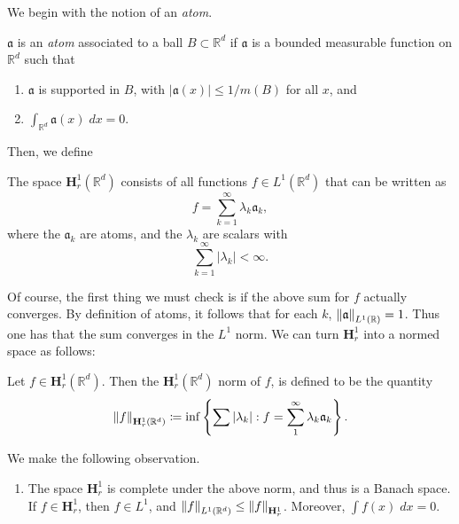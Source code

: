 \documentclass{article}
\begin{document}
 We begin with the notion of an \textit{atom}. 
\begin{definition}[Atom]
	$\mathfrak{a}$ is an \textit{atom} associated to a ball $B\subset \mathbb{R}^{d}$ if $\mathfrak{a}$ is a bounded measurable function on $\mathbb{R}^{d}$ such that \vspace{-0.25cm}
	\begin{enumerate}[itemsep =-2pt, label = (\roman{*})]
		\item $\mathfrak{a}$ is supported in $B$, with $|\mathfrak{a}(x)| \leq 1/m(B)$ for all $x$, and 
		\item $\int_{\mathbb{R}^{d}} \mathfrak{a}(x)\;dx = 0$. 
	\end{enumerate} 
\end{definition} 
Then, we define 
\begin{definition}
	The space $\mathbf{H}_{r}^{1}(\mathbb{R}^{d})$ consists of all functions $f \in L^{1}(\mathbb{R}^{d})$ that can be written as 
	\begin{equation*}
		f = \sum_{k = 1}^{\infty}\lambda_{k}\mathfrak{a}_{k}, 
	\end{equation*} 
	where the $\mathfrak{a}_{k}$ are atoms, and the $\lambda_{k}$ are scalars with 
	\begin{equation*}
		\sum_{k = 1}^{\infty}|\lambda_{k}| < \infty. 
	\end{equation*}
\end{definition} 
Of course, the first thing we must check is if the above sum for $f$ actually converges. By definition of atoms, it follows that for each $k$, $\left\Vert \mathfrak{a} \right\Vert_{L^{1}(\mathbb{R})} = 1$. Thus one has that the sum converges in the $L^{1}$ norm. We can turn $\mathbf{H}^{1}_{r}$ into a normed space as follows: 
\begin{definition}
	Let $f \in \mathbf{H}^{1}_{r}(\mathbb{R}^{d})$. Then the $\mathbf{H}^{1}_{r}(\mathbb{R}^{d})$ norm of $f$, is defined to be the quantity 
	\begin{equation*}
		\left\Vert f \right\Vert_{\mathbf{H}^{1}_{r}(\mathbb{R}^{d})}\coloneqq \inf\left\{\sum |\lambda_{k}|: f = \sum_{1}^{\infty} \lambda_{k}\mathfrak{a}_{k}\right\}. 
	\end{equation*} 
\end{definition} 
We make the following observation. \vspace{-0.25cm}
\begin{enumerate}[itemsep =-2pt,label = (\roman{*})]
	\item The space $\mathbf{H}^{1}_{r}$ is complete under the above norm, and thus is a Banach space. If $f \in \mathbf{H}^{1}_{r}$, then $f \in L^{1}$, and $\left\Vert f \right\Vert_{L^1(\mathbb{R}^{d})} \leq \left\Vert f \right\Vert_{\mathbf{H}^{1}_{r}}$. Moreover, $\int f(x)\;dx = 0$. 
\end{enumerate}
\end{document}
